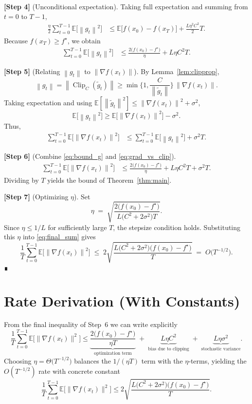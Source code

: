 \documentclass{article}
\newcommand{\EE}{\mathbb{E}}
\newcommand{\norm}[1]{\left\lVert#1\right\rVert}
\newcommand{\clip}[2]{\operatorname{Clip}_{#1}\!\left(#2\right)}
\begin{document}
\noindent\textbf{[Step 4]} (Unconditional expectation). Taking full expectation and summing from $t=0$ to $T-1$,
\begin{align}
\frac{\eta}{2}\sum_{t=0}^{T-1}\EE\!\big[\norm{g_t}^2\big]
&\le \EE\!\big[f(x_0)-f(x_T)\big]
+ \frac{L\eta^2 C^2}{2}T . \label{eq:sum}
\end{align}
Because $f(x_T)\ge f^\star$, we obtain
\begin{align}
\sum_{t=0}^{T-1}\EE\!\big[\norm{g_t}^2\big]
&\le \frac{2\big(f(x_0)-f^\star\big)}{\eta}
+ L\eta C^2 T . \label{eq:bound_g}
\end{align}

\noindent\textbf{[Step 5]} (Relating $\norm{g_t}$ to $\norm{\nabla f(x_t)}$). By Lemma~\ref{lem:clipprop},
\[
\norm{g_t} = \norm{\clip{C}{\tilde g_t}}
\ge \min\!\Big\{1,\frac{C}{\norm{\tilde g_t}}\Big\}\,\norm{\nabla f(x_t)} .
\]
Taking expectation and using $\EE[\norm{\tilde g_t}^2]\le \norm{\nabla f(x_t)}^2+\sigma^2$,
\[
\EE\!\big[\norm{g_t}^2\big] \ge
\EE\!\big[\norm{\nabla f(x_t)}^2\big] - \sigma^2 .
\]
Thus,
\begin{align}
\sum_{t=0}^{T-1}\EE\!\big[\norm{\nabla f(x_t)}^2\big]
&\le \sum_{t=0}^{T-1}\EE\!\big[\norm{g_t}^2\big] + \sigma^2 T . \label{eq:grad_vs_clip}
\end{align}

\noindent\textbf{[Step 6]} (Combine \eqref{eq:bound_g} and \eqref{eq:grad_vs_clip}).
\begin{align}
\sum_{t=0}^{T-1}\EE\!\big[\norm{\nabla f(x_t)}^2\big]
&\le
\frac{2\big(f(x_0)-f^\star\big)}{\eta}
+ L\eta C^2 T
+ \sigma^2 T . \label{eq:final_sum}
\end{align}
Dividing by $T$ yields the bound of Theorem~\ref{thm:main}.

\noindent\textbf{[Step 7]} (Optimizing $\eta$). Set
\[
\eta \;=\; \sqrt{\frac{2\big(f(x_0)-f^\star\big)}
{L\big(C^2+2\sigma^2\big)T}} .
\]
Since $\eta\le 1/L$ for sufficiently large $T$, the stepsize condition holds. Substituting this $\eta$ into \eqref{eq:final_sum} gives
\[
\frac{1}{T}\sum_{t=0}^{T-1}\EE\!\big[\norm{\nabla f(x_t)}^2\big]
\;\le\;
2\sqrt{\frac{L\big(C^2+2\sigma^2\big)\big(f(x_0)-f^\star\big)}{T}}
\;=\;O\!\big(T^{-1/2}\big).
\]
∎

\section*{Rate Derivation (With Constants)}
From the final inequality of Step~6 we can write explicitly
\[
\frac{1}{T}\sum_{t=0}^{T-1}\EE\!\big[\|\nabla f(x_t)\|^2\big]
\le
\underbrace{\frac{2\big(f(x_0)-f^\star\big)}{\eta T}}_{\text{optimization term}}
\;+\;
\underbrace{L\eta C^2}_{\text{bias due to clipping}}
\;+\;
\underbrace{L\eta\sigma^2}_{\text{stochastic variance}} .
\]
Choosing $\eta = \Theta\!\big(T^{-1/2}\big)$ balances the $1/(\eta T)$ term with the $\eta$‑terms, yielding the $O(T^{-1/2})$ rate with concrete constant
\[
\frac{1}{T}\sum_{t=0}^{T-1}\EE\!\big[\|\nabla f(x_t)\|^2\big]
\le
2\sqrt{\frac{L\big(C^2+2\sigma^2\big)\big(f(x_0)-f^\star\big)}{T}} .
\]
\end{document}
